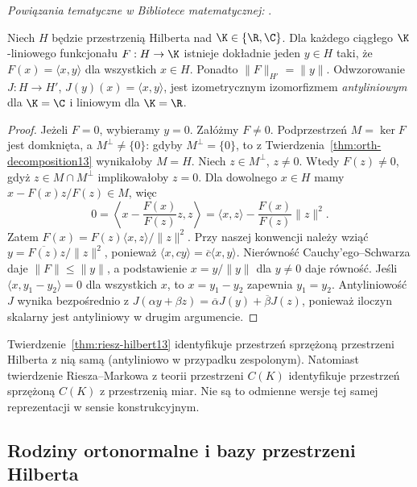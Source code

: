 \noindent\emph{Powiązania tematyczne w Bibliotece matematycznej:} .


\begin{twierdzenie}
\label{thm:riesz-hilbert13}
Niech $H$ będzie przestrzenią Hilberta nad $\K\in\{\R,\C\}$.
Dla każdego ciągłego $\K$-liniowego funkcjonału $F:H\to\K$
istnieje dokładnie jeden $y\in H$ taki, że
$F(x)=\langle x,y\rangle$ dla wszystkich $x\in H$.
Ponadto $\|F\|_{H'}=\|y\|$.
Odwzorowanie $J:H\to H'$, $J(y)(x)=\langle x,y\rangle$,
jest izometrycznym izomorfizmem \emph{antyliniowym} dla $\K=\C$
i liniowym dla $\K=\R$.
\end{twierdzenie}
\begin{proof}
Jeżeli $F=0$, wybieramy $y=0$. Załóżmy $F\ne0$.
Podprzestrzeń $M=\ker F$ jest domknięta, a $M^\perp\ne\{0\}$:
gdyby $M^\perp=\{0\}$, to z Twierdzenia~\ref{thm:orth-decomposition13}
wynikałoby $M=H$.
Niech $z\in M^\perp$, $z\ne0$. Wtedy $F(z)\ne0$, gdyż
$z\in M\cap M^\perp$ implikowałoby $z=0$.
Dla dowolnego $x\in H$ mamy
$x-F(x)z/F(z)\in M$, więc
\[
0=\left\langle x-\frac{F(x)}{F(z)}z,z\right\rangle
=\langle x,z\rangle-\frac{F(x)}{F(z)}\|z\|^2.
\]
Zatem $F(x)=F(z)\langle x,z\rangle/\|z\|^2$.
Przy naszej konwencji należy wziąć
$y=\overline{F(z)}z/\|z\|^2$, ponieważ
$\langle x,cy\rangle=\overline c\langle x,y\rangle$.
Nierówność Cauchy'ego--Schwarza daje $\|F\|\le\|y\|$,
a podstawienie $x=y/\|y\|$ dla $y\ne0$ daje równość.
Jeśli $\langle x,y_1-y_2\rangle=0$ dla wszystkich $x$, to
$x=y_1-y_2$ zapewnia $y_1=y_2$. Antyliniowość $J$
wynika bezpośrednio z $J(\alpha y+\beta z)
=\overline\alpha J(y)+\overline\beta J(z)$, ponieważ
iloczyn skalarny jest antyliniowy w drugim argumencie.
\end{proof}

\begin{uwaga}
\label{rem:two-riesz13}
Twierdzenie~\ref{thm:riesz-hilbert13} identyfikuje przestrzeń sprzężoną
przestrzeni Hilberta z nią samą (antyliniowo w przypadku zespolonym).
Natomiast twierdzenie Riesza--Markowa z teorii przestrzeni $C(K)$ identyfikuje
przestrzeń sprzężoną $C(K)$ z przestrzenią miar. Nie są to
odmienne wersje tej samej reprezentacji w sensie konstrukcyjnym.
\end{uwaga}

\subsection{Rodziny ortonormalne i bazy przestrzeni Hilberta}

